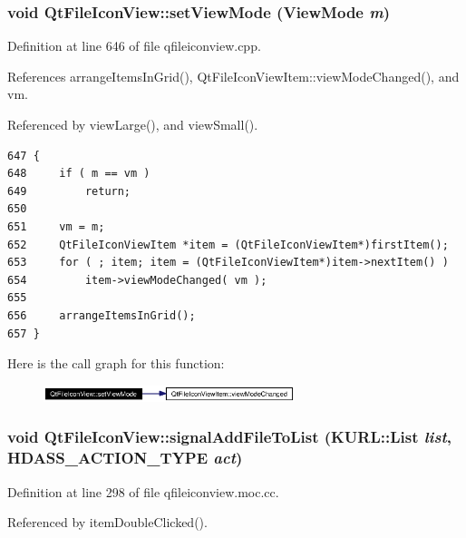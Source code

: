\subsubsection{\setlength{\rightskip}{0pt plus 5cm}void Qt\-File\-Icon\-View::set\-View\-Mode ({\bf View\-Mode} {\em m})}\label{classQtFileIconView_QtFileIconViewa1}




Definition at line 646 of file qfileiconview.cpp.

References arrange\-Items\-In\-Grid(), Qt\-File\-Icon\-View\-Item::view\-Mode\-Changed(), and vm.

Referenced by view\-Large(), and view\-Small().



\footnotesize\begin{verbatim}647 {
648     if ( m == vm )
649         return;
650 
651     vm = m;
652     QtFileIconViewItem *item = (QtFileIconViewItem*)firstItem();
653     for ( ; item; item = (QtFileIconViewItem*)item->nextItem() )
654         item->viewModeChanged( vm );
655 
656     arrangeItemsInGrid();
657 }
\end{verbatim}\normalsize 


Here is the call graph for this function:\begin{figure}[H]
\begin{center}
\leavevmode
\includegraphics[width=208pt]{classQtFileIconView_QtFileIconViewa1_cgraph}
\end{center}
\end{figure}
\subsubsection{\setlength{\rightskip}{0pt plus 5cm}void Qt\-File\-Icon\-View::signal\-Add\-File\-To\-List (KURL::List {\em list}, {\bf HDASS\_\-ACTION\_\-TYPE} {\em act})\hspace{0.3cm}{\tt  [signal]}}\label{classQtFileIconView_QtFileIconViewl8}




Definition at line 298 of file qfileiconview.moc.cc.

Referenced by item\-Double\-Clicked().



